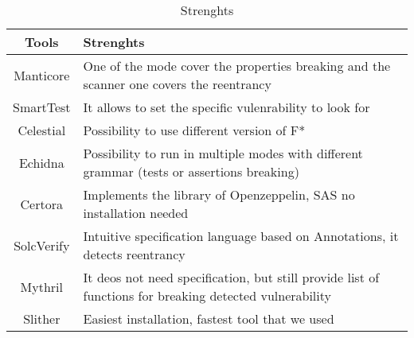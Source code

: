 \begin{center}
\begin{table*}
    \caption{Strenghts}
        \label{tab:Strenghts}
        \begin{tabular}{cl}
        \toprule
            Tools  &  Strenghts \\
            \midrule
            Manticore & One of the mode cover the properties breaking and the scanner one covers the reentrancy\\
            SmartTest & It allows to set the specific vulenrability to look for  \\
            Celestial & Possibility to use different version of F*  \\
            Echidna &  Possibility to run in multiple modes with different grammar (tests or assertions breaking)\\
            Certora & Implements the library of Openzeppelin, SAS no installation needed \\ 
            SolcVerify & Intuitive specification language based on Annotations, it detects reentrancy\\
            Mythril & It deos not need specification, but still provide list of functions for breaking detected vulnerability  \\ 
            Slither & Easiest installation, fastest tool that we used \\ 
        \bottomrule
        \end{tabular}
    \end{table*}
\end{center}
